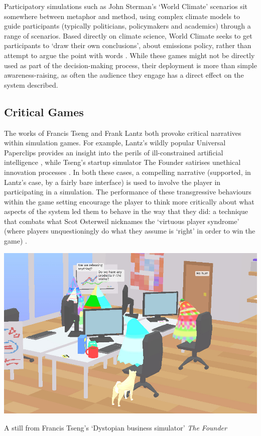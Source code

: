 \documentclass[nofonts,nols,justified,nobib]{tufte-book}
\begin{document}
Participatory simulations such as John Sterman's `World Climate' scenarios sit somewhere between metaphor and method, using complex climate models to guide participants (typically politicians, policymakers and academics) through a range of scenarios. Based directly on climate science, World Climate seeks to get participants to `draw their own conclusions', about emissions policy, rather than attempt to argue the point with words \cite{sterman_john_2013}. While these games might not be directly used as part of the decision-making process, their deployment is more than simple awareness-raising, as often the audience they engage has a direct effect on the system described.

\subsection*{Critical Games}

The works of Francis Tseng and Frank Lantz both provoke critical narratives within simulation games. For example, Lantz's wildly popular Universal Paperclips provides an insight into the perils of ill-constrained artificial intelligence \cite{lantz_universal_2017}, while Tseng's startup simulator The Founder satirises unethical innovation processes \cite{tseng_founder_2017}. In both these cases, a compelling narrative (supported, in Lantz's case, by a fairly bare interface) is used to involve the player in participating in a simulation. The performance of these transgressive behaviours within the game setting encourage the player to think more critically about what aspects of the system led them to behave in the way that they did: a technique that combats what Scot Osterweil nicknames the `virtuous player syndrome' (where players unquestioningly do what they assume is `right' in order to win the game) \cite{osterweil_civic_2011}.

\begin{marginfigure}
\includegraphics[width=\textwidth]{img/1/the-founder.jpg}
\caption{A still from Francis Tseng's `Dystopian business simulator' \emph{The Founder} \label{b} \cite{tseng_founder_2017-1}}
\end{marginfigure}
\end{document}
